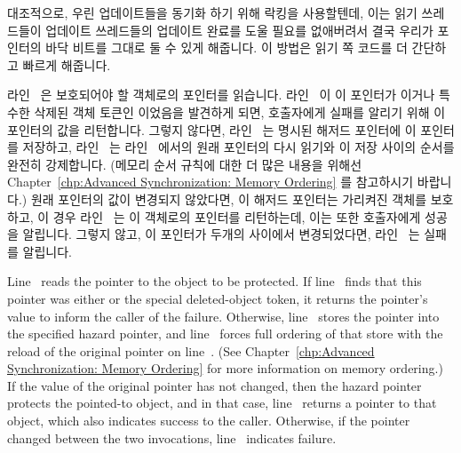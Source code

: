 \begin{fcvref}
\begin{fcvref}
{	대조적으로, 우린 업데이트들을 동기화 하기 위해 락킹을 사용할텐데, 이는
	읽기 쓰레드들이 업데이트 쓰레드들의 업데이트 완료를 도울 필요를
	없애버려서 결국 우리가 포인터의 바닥 비트를 그대로 둘 수 있게 해줍니다.
	이 방법은 읽기 쪽 코드를 더 간단하고 빠르게 해줍니다.

}\QuickQuizEnd

라인~ 은 보호되어야 할 객체로의 포인터를 읽습니다.
라인~ 이 이 포인터가  이거나 특수한 삭제된 객체
토큰인  이었음을 발견하게 되면, 호출자에게 실패를 알리기 위해
이 포인터의 값을 리턴합니다.
그렇지 않다면, 라인~ 는 명시된 해저드 포인터에 이 포인터를
저장하고, 라인~ 는 라인~ 에서의 원래 포인터의 다시
읽기와 이 저장 사이의 순서를 완전히 강제합니다.
(메모리 순서 규칙에 대한 더 많은 내용을 위해선
Chapter~\ref{chp:Advanced Synchronization: Memory Ordering} 를 참고하시기
바랍니다.)
원래 포인터의 값이 변경되지 않았다면, 이 해저드 포인터는 가리켜진 객체를
보호하고, 이 경우 라인~ 는 이 객체로의 포인터를 리턴하는데,
이는 또한 호출자에게 성공을 알립니다.
그렇지 않고, 이 포인터가 두개의  사이에서 변경되었다면,
라인~ 는 실패를 알립니다.

\iffalse

Line~ reads the pointer to the object to be protected.
If line~ finds that this pointer was either  or
the special  deleted-object token, it returns
the pointer's value to inform the caller of the failure.
Otherwise, line~ stores the pointer into the specified
hazard pointer, and line~ forces full ordering of that
store with the reload of the original pointer on line~.
(See Chapter~\ref{chp:Advanced Synchronization: Memory Ordering}
for more information on memory ordering.)
If the value of the original pointer has not changed, then the hazard
pointer protects the pointed-to object, and in that case,
line~ returns a pointer to that object, which also
indicates success to the caller.
Otherwise, if the pointer changed between the two 
invocations, line~ indicates failure.


\end{fcvref}
\end{fcvref}

